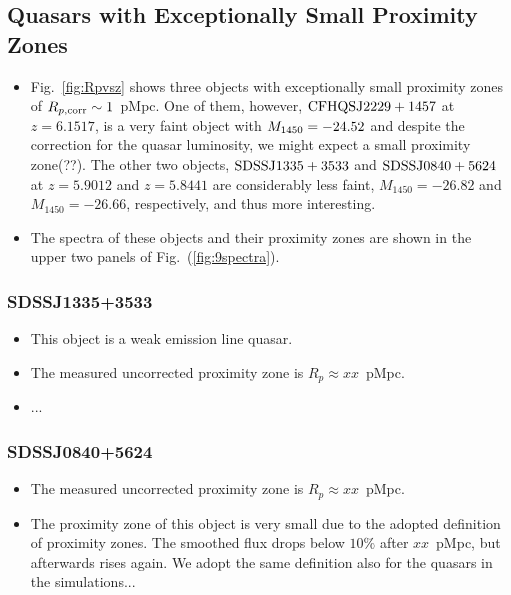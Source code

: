 \documentclass[iop]{emulateapj}
\begin{document}
\subsection{Quasars with Exceptionally Small Proximity Zones}\label{sec:small_zones}

\begin{itemize}
\item Fig.~\ref{fig:Rpvsz} shows three objects with exceptionally small proximity zones of $R_{p, \rm corr}\sim 1$~pMpc. One of them, however, $\rm CFHQS J2229+1457$ at $z=6.1517$, is a very faint object with $M_{\rm 1450}=-24.52$ and despite the correction for the quasar luminosity, we might expect a small proximity zone(??). The other two objects, $\rm SDSSJ1335+3533$ and $\rm SDSSJ0840+5624$ at $z=5.9012$ and $z=5.8441$ are considerably less faint, $M_{1450}=-26.82$ and $M_{1450}=-26.66$, respectively, and thus more interesting. 
\item The spectra of these objects and their proximity zones are shown in the upper two panels of Fig.~(\ref{fig:9spectra}).
\end{itemize}
 
\subsubsection*{SDSSJ1335+3533} 
\begin{itemize}
\item This object is a weak emission line quasar. 
\item The measured uncorrected proximity zone is $R_p\approx xx$~pMpc. 
\item ...
\end{itemize}

\subsubsection*{SDSSJ0840+5624} 
\begin{itemize}
\item The measured uncorrected proximity zone is $R_p\approx xx$~pMpc.  
\item The proximity zone of this object is very small due to the adopted definition of proximity zones. The smoothed flux drops below $10\%$ after $xx$~pMpc, but afterwards rises again. We adopt the same definition also for the quasars in the simulations...
\end{itemize}

\end{document}
